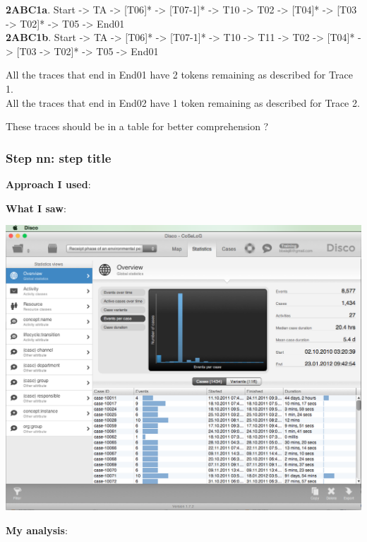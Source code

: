 \documentclass[]{article}
\begin{document}
\textbf{2ABC1a}. Start -\textgreater{} TA -\textgreater{} {[}T06{]}*
-\textgreater{} {[}T07-1{]}* -\textgreater{} T10 -\textgreater{} T02
-\textgreater{} {[}T04{]}* -\textgreater{} {[}T03 -\textgreater{}
T02{]}* -\textgreater{} T05 -\textgreater{} End01\\\textbf{2ABC1b}.
Start -\textgreater{} TA -\textgreater{} {[}T06{]}* -\textgreater{}
{[}T07-1{]}* -\textgreater{} T10 -\textgreater{} T11 -\textgreater{} T02
-\textgreater{} {[}T04{]}* -\textgreater{} {[}T03 -\textgreater{}
T02{]}* -\textgreater{} T05 -\textgreater{} End01

All the traces that end in End01 have 2 tokens remaining as described
for Trace 1.\\All the traces that end in End02 have 1 token remaining as
described for Trace 2.

These traces should be in a table for better comprehension ?

\subsubsection{Step nn: step title}\label{step-nn-step-title}

\textbf{Approach I used}:

\textbf{What I saw}:

\includegraphics{dummy.png}

\textbf{My analysis}:
\end{document}
